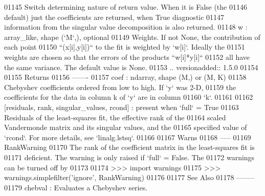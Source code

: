 \begin{DoxyCode}
01145 \textcolor{stringliteral}{        Switch determining nature of return value. When it is False (the}
01146 \textcolor{stringliteral}{        default) just the coefficients are returned, when True diagnostic}
01147 \textcolor{stringliteral}{        information from the singular value decomposition is also returned.}
01148 \textcolor{stringliteral}{    w : array\_like, shape (`M`,), optional}
01149 \textcolor{stringliteral}{        Weights. If not None, the contribution of each point}
01150 \textcolor{stringliteral}{        ``(x[i],y[i])`` to the fit is weighted by `w[i]`. Ideally the}
01151 \textcolor{stringliteral}{        weights are chosen so that the errors of the products ``w[i]*y[i]``}
01152 \textcolor{stringliteral}{        all have the same variance.  The default value is None.}
01153 \textcolor{stringliteral}{        .. versionadded:: 1.5.0}
01154 \textcolor{stringliteral}{}
01155 \textcolor{stringliteral}{    Returns}
01156 \textcolor{stringliteral}{    -------}
01157 \textcolor{stringliteral}{    coef : ndarray, shape (M,) or (M, K)}
01158 \textcolor{stringliteral}{        Chebyshev coefficients ordered from low to high. If `y` was 2-D,}
01159 \textcolor{stringliteral}{        the coefficients for the data in column k  of `y` are in column}
01160 \textcolor{stringliteral}{        `k`.}
01161 \textcolor{stringliteral}{}
01162 \textcolor{stringliteral}{    [residuals, rank, singular\_values, rcond] : present when `full` = True}
01163 \textcolor{stringliteral}{        Residuals of the least-squares fit, the effective rank of the}
01164 \textcolor{stringliteral}{        scaled Vandermonde matrix and its singular values, and the}
01165 \textcolor{stringliteral}{        specified value of `rcond`. For more details, see `linalg.lstsq`.}
01166 \textcolor{stringliteral}{}
01167 \textcolor{stringliteral}{    Warns}
01168 \textcolor{stringliteral}{    -----}
01169 \textcolor{stringliteral}{    RankWarning}
01170 \textcolor{stringliteral}{        The rank of the coefficient matrix in the least-squares fit is}
01171 \textcolor{stringliteral}{        deficient. The warning is only raised if `full` = False.  The}
01172 \textcolor{stringliteral}{        warnings can be turned off by}
01173 \textcolor{stringliteral}{}
01174 \textcolor{stringliteral}{        >>> import warnings}
01175 \textcolor{stringliteral}{        >>> warnings.simplefilter('ignore', RankWarning)}
01176 \textcolor{stringliteral}{}
01177 \textcolor{stringliteral}{    See Also}
01178 \textcolor{stringliteral}{    --------}
01179 \textcolor{stringliteral}{    chebval : Evaluates a Chebyshev series.}

\end{DoxyCode}
